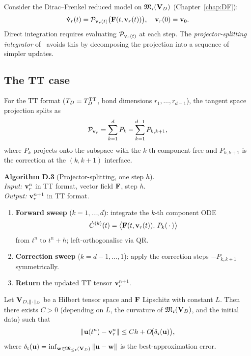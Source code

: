 Consider the Dirac--Frenkel reduced model on $\mathfrak{M}_{\mathfrak{r}}(\mathbf{V}_D)$
(Chapter~\ref{chap:DF}):
\begin{equation}
\label{eq:app:df_reduced}
    \dot{\mathbf{v}}_r(t)
    = \mathcal{P}_{\mathbf{v}_r(t)}\bigl(\mathbf{F}(t,\mathbf{v}_r(t))\bigr),
    \quad \mathbf{v}_r(0) = \mathbf{v}_0.
\end{equation}
Direct integration requires evaluating $\mathcal{P}_{\mathbf{v}_r(t)}$ at each
step. The \emph{projector-splitting integrator}
of~\cite{LubichOseledetsVandereycken2015} avoids this by decomposing
the projection into a sequence of simpler updates.

\subsection*{The TT case}

For the TT format ($T_D = T_D^{\mathrm{TT}}$, bond dimensions
$r_1,\ldots,r_{d-1}$), the tangent space projection splits as
\begin{equation}
\label{eq:app:splitting}
    \mathcal{P}_{\mathbf{v}_r}
    = \sum_{k=1}^{d} P_k
      - \sum_{k=1}^{d-1} P_{k,k+1},
\end{equation}
where $P_k$ projects onto the subspace with the $k$-th component free
and $P_{k,k+1}$ is the correction at the $(k,k{+}1)$ interface.

\medskip
\noindent\textbf{Algorithm D.3} (Projector-splitting, one step $h$).\\
\textit{Input:} $\mathbf{v}_r^n$ in TT format, vector field $\mathbf{F}$, step $h$.\\
\textit{Output:} $\mathbf{v}_r^{n+1}$ in TT format.
\begin{enumerate}
\item \textbf{Forward sweep} ($k = 1,\ldots,d$): integrate the
    $k$-th component ODE
    \begin{equation*}
        \dot{C}^{(k)}(t)
        = \bigl\langle \mathbf{F}(t,\mathbf{v}_r(t)),\,
          P_k(\,\cdot\,) \bigr\rangle
    \end{equation*}
    from $t^n$ to $t^n + h$; left-orthogonalise via QR.
\item \textbf{Correction sweep} ($k = d-1,\ldots,1$): apply the
    correction steps $-P_{k,k+1}$ symmetrically.
\item \textbf{Return} the updated TT tensor $\mathbf{v}_r^{n+1}$.
\end{enumerate}

\begin{theorem}
\label{thm:app:splitting_error}
Let $\mathbf{V}_{D,\|\cdot\|_D}$ be a Hilbert tensor space and $\mathbf{F}$ Lipschitz with
constant $L$. Then there exists $C > 0$ (depending on $L$, the
curvature of $\mathfrak{M}_{\mathfrak{r}}(\mathbf{V}_D)$, and the initial data) such that
\begin{equation}
\label{eq:app:splitting_bound}
    \|\mathbf{u}(t^n) - \mathbf{v}_r^n\|
    \leq Ch + O\!\bigl(\delta_{\mathfrak{r}}(\mathbf{u})\bigr),
\end{equation}
where $\delta_{\mathfrak{r}}(\mathbf{u})
= \inf_{\mathbf{w} \in \mathfrak{M}_{\leq\mathfrak{r}}(\mathbf{V}_D)} \|\mathbf{u} - \mathbf{w}\|$ is the
best-approximation error.
\end{theorem}

